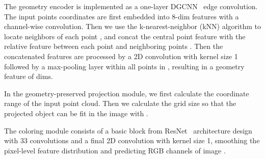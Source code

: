 \documentclass{article}
\begin{document}
The geometry encoder is implemented as a one-layer DGCNN~\cite{wang2019dgcnn} edge convolution. The input points coordinates are first embedded into 8-dim features  with a channel-wise convolution. Then we use the k-nearest-neighbor (kNN) algorithm to locate  neighbors  of each point , and concat the central point feature  with the relative feature  between each point  and neighboring points . Then the concatenated features are processed by a 2D convolution with kernel size 1 followed by a max-pooling layer within all points in , resulting in a geometry feature  of  dims.

In the geometry-preserved projection module, we first calculate the coordinate range  of the input point cloud. Then we calculate the grid size  so that the projected object can be fit in the image  with .

The coloring module consists of a basic block from ResNet~\cite{he2016resnet} architecture design with 33 convolutions and a final 2D convolution with kernel size 1, smoothing the pixel-level feature distribution and predicting RGB channels of image .
\end{document}
